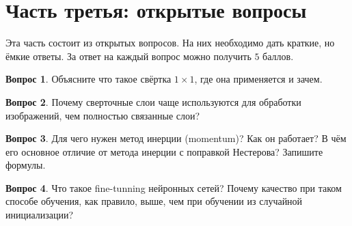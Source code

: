\documentclass[12pt]{article}
\theoremstyle{definition}
\newtheorem{question}{Вопрос}
\begin{document}
\vspace{4cm} 

\newpage 

\section*{Часть третья: открытые вопросы}

Эта часть состоит из открытых вопросов. На них необходимо дать краткие, но ёмкие ответы. За ответ на каждый вопрос можно получить $5$ баллов.

\begin{question}
Объясните что такое свёртка $1 \times 1$, где она применяется и зачем.
\end{question}

\vspace{5cm} 


\begin{question} 
Почему сверточные слои чаще используются для обработки изображений, чем полностью связанные слои?
\end{question}

\vspace{5cm} 

\begin{question} 
Для чего нужен метод инерции (momentum)? Как он работает? В чём его основное отличие от метода инерции с поправкой Нестерова? Запишите формулы.
\end{question}

\vspace{5cm} 

\newpage 

\begin{question}
Что такое fine-tunning нейронных сетей? Почему качество при таком способе обучения, как правило, выше, чем при обучении из случайной инициализации?
\end{question}

\vspace{5cm} 
\end{document}
